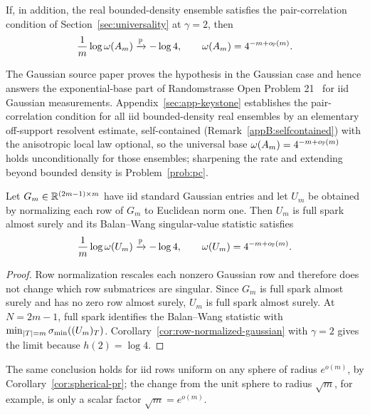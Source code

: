 \begin{corollary}\label{cor:pr-cond}
If, in addition, the real bounded-density ensemble satisfies the
pair-correlation condition of Section~\ref{sec:universality} at \(\gamma=2\),
then
\[
  \frac{1}{m}\log\omega(A_m)\xrightarrow{\mathbb{P}}-\log4,
  \qquad
  \omega(A_m)=4^{-m+o_{\mathbb{P}}(m)}.
\]
\end{corollary}

The Gaussian source paper \cite{ShmaloExtremal2026} proves the hypothesis in
the Gaussian case and hence answers the exponential-base part of Randomstrasse
Open Problem 21~\cite{BandeiraStablePhase} for iid Gaussian measurements.
Appendix~\ref{sec:app-keystone} establishes the pair-correlation condition for
all iid bounded-density real ensembles by an elementary off-support resolvent
estimate, self-contained (Remark~\ref{appB:selfcontained}) with the anisotropic
local law optional, so the universal base \(\omega(A_m)=4^{-m+o_{\mathbb{P}}(m)}\) holds
unconditionally for those ensembles; sharpening the rate and extending beyond
bounded density is Problem~\ref{prob:pc}.

\begin{corollary}\label{cor:pr-normalized-gaussian}
Let \(G_m\in\mathbb{R}^{(2m-1)\times m}\) have iid standard Gaussian entries and let
\(U_m\) be obtained by normalizing each row of \(G_m\) to Euclidean norm one.
Then \(U_m\) is full spark almost surely and its Balan--Wang singular-value
statistic satisfies
\[
  \frac1m\log\omega(U_m)\xrightarrow{\mathbb{P}}-\log4,
  \qquad
  \omega(U_m)=4^{-m+o_{\mathbb{P}}(m)}.
\]
\end{corollary}

\begin{proof}
Row normalization rescales each nonzero Gaussian row and therefore does not
change which row submatrices are singular.  Since \(G_m\) is full spark almost
surely and has no zero row almost surely, \(U_m\) is full spark almost surely.
At \(N=2m-1\), full spark identifies the Balan--Wang statistic with
\(\min_{|T|=m}\sigma_{\min}((U_m)_T)\).  Corollary~\ref{cor:row-normalized-gaussian}
with \(\gamma=2\) gives the limit because \(h(2)=\log4\).
\end{proof}

The same conclusion holds for iid rows uniform on any sphere of radius
\(e^{o(m)}\), by Corollary~\ref{cor:spherical-pr}; the change from the unit
sphere to radius \(\sqrt m\), for example, is only a scalar factor
\(\sqrt m=e^{o(m)}\).

